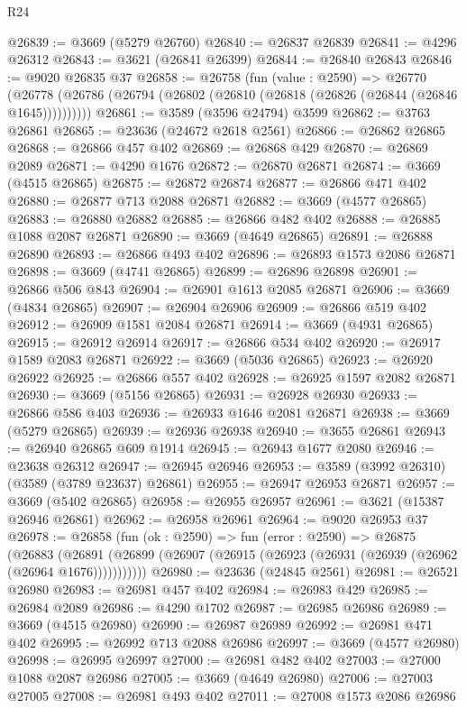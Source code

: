 \begin{lexlean}{R24}
\begin{coremodule}
@26839 := @3669 (@5279 @26760)
@26840 := @26837 @26839
@26841 := @4296 @26312
@26843 := @3621 (@26841 @26399)
@26844 := @26840 @26843
@26846 := @9020 @26835 @37
@26858 := @26758
    (fun (value : @2590) =>
    @26770 (@26778 (@26786 (@26794 (@26802 (@26810 (@26818 (@26826 (@26844 (@26846 @1645))))))))))
@26861 := @3589 (@3596 @24794) @3599
@26862 := @3763 @26861
@26865 := @23636 (@24672 @2618 @2561)
@26866 := @26862 @26865
@26868 := @26866 @457 @402
@26869 := @26868 @429
@26870 := @26869 @2089
@26871 := @4290 @1676
@26872 := @26870 @26871
@26874 := @3669 (@4515 @26865)
@26875 := @26872 @26874
@26877 := @26866 @471 @402
@26880 := @26877 @713 @2088 @26871
@26882 := @3669 (@4577 @26865)
@26883 := @26880 @26882
@26885 := @26866 @482 @402
@26888 := @26885 @1088 @2087 @26871
@26890 := @3669 (@4649 @26865)
@26891 := @26888 @26890
@26893 := @26866 @493 @402
@26896 := @26893 @1573 @2086 @26871
@26898 := @3669 (@4741 @26865)
@26899 := @26896 @26898
@26901 := @26866 @506 @843
@26904 := @26901 @1613 @2085 @26871
@26906 := @3669 (@4834 @26865)
@26907 := @26904 @26906
@26909 := @26866 @519 @402
@26912 := @26909 @1581 @2084 @26871
@26914 := @3669 (@4931 @26865)
@26915 := @26912 @26914
@26917 := @26866 @534 @402
@26920 := @26917 @1589 @2083 @26871
@26922 := @3669 (@5036 @26865)
@26923 := @26920 @26922
@26925 := @26866 @557 @402
@26928 := @26925 @1597 @2082 @26871
@26930 := @3669 (@5156 @26865)
@26931 := @26928 @26930
@26933 := @26866 @586 @403
@26936 := @26933 @1646 @2081 @26871
@26938 := @3669 (@5279 @26865)
@26939 := @26936 @26938
@26940 := @3655 @26861
@26943 := @26940 @26865 @609 @1914
@26945 := @26943 @1677 @2080
@26946 := @23638 @26312
@26947 := @26945 @26946
@26953 := @3589 (@3992 @26310) (@3589 (@3789 @23637) @26861)
@26955 := @26947 @26953 @26871
@26957 := @3669 (@5402 @26865)
@26958 := @26955 @26957
@26961 := @3621 (@15387 @26946 @26861)
@26962 := @26958 @26961
@26964 := @9020 @26953 @37
@26978 := @26858
    (fun (ok : @2590) =>
    fun (error : @2590) =>
    @26875
      (@26883
        (@26891 (@26899 (@26907 (@26915 (@26923 (@26931 (@26939 (@26962 (@26964 @1676)))))))))))
@26980 := @23636 (@24845 @2561)
@26981 := @26521 @26980
@26983 := @26981 @457 @402
@26984 := @26983 @429
@26985 := @26984 @2089
@26986 := @4290 @1702
@26987 := @26985 @26986
@26989 := @3669 (@4515 @26980)
@26990 := @26987 @26989
@26992 := @26981 @471 @402
@26995 := @26992 @713 @2088 @26986
@26997 := @3669 (@4577 @26980)
@26998 := @26995 @26997
@27000 := @26981 @482 @402
@27003 := @27000 @1088 @2087 @26986
@27005 := @3669 (@4649 @26980)
@27006 := @27003 @27005
@27008 := @26981 @493 @402
@27011 := @27008 @1573 @2086 @26986

\end{coremodule}
\end{lexlean}
